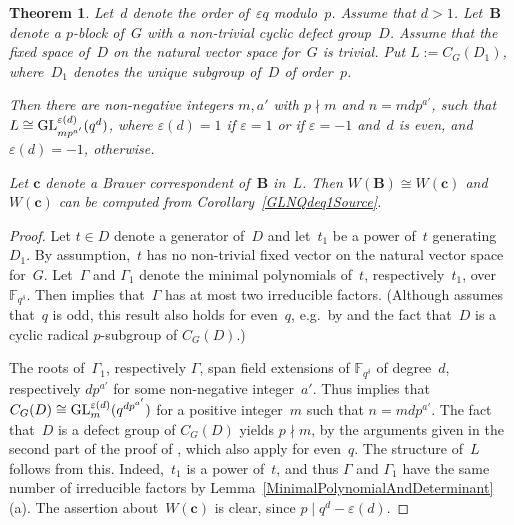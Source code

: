 \documentclass[12pt]{amsart}
\newcommand{\bB}{{\mathbf{B}}}
\newcommand{\bc}{{\mathbf{c}}}
\def\GL{ \text{\rm GL} }
\newtheorem{thm}{Theorem}[subsection]
\theoremstyle{theorem}
\theoremstyle{definition}
\theoremstyle{remark}
\begin{document}
\begin{thm}
\label{GLNQdneq1}
Let~$d$ denote the order of~$\varepsilon q$ modulo~$p$. Assume that $d > 1$.
Let~${\bB}$ denote a $p$-block of~${G}$ with a non-trivial cyclic 
defect group~${D}$. Assume that the fixed space of~${D}$ on the 
natural vector space for~${G}$ is trivial.
Put ${L} := C_{{G}}( {D}_1 )$, where~${D}_1$ denotes the 
unique subgroup of~${D}$ of order~$p$.

Then there are non-negative integers $m, a'$ with $p \nmid m$ and 
$n = mdp^{a'}$, such that 
${L} \cong \GL_{mp^{a'}}^{\varepsilon(d)}( q^{d} )$, where
$\varepsilon(d) = 1$ if $\varepsilon = 1$ or if $\varepsilon = -1$ and~$d$ is 
even, and $\varepsilon(d) = -1$, otherwise.

Let ${\bc}$ denote a Brauer correspondent of~${\bB}$ in~${L}$.  
Then $W( {\bB} ) \cong W( {\bc} )$ and $W( {\bc} )$ can be
computed from 
{\rm Corollary~\ref{GLNQdeq1Source}}.
\end{thm}
\begin{proof}
Let $t \in {D}$ denote a generator of~${D}$ and let~$t_1$ be a power of~$t$ 
generating~${D}_1$. By assumption,~$t$ has no non-trivial fixed vector on the 
natural vector space for~${G}$. Let~$\Gamma$ and $\Gamma_1$ denote the minimal
polynomials of~$t$, respectively~$t_1$, over $\mathbb{F}_{q^{\delta}}$. Then 
\cite[Theorem (3C)]{fs2} implies that~$\Gamma$ has at most two irreducible 
factors. (Although \cite{fs2} assumes that~$q$ is odd, this result also holds 
for even~$q$, e.g.\ by \cite[Theorem~$6.1.2$]{FLO} and the fact that~$D$ is a 
cyclic radical $p$-subgroup of $C_G(D)$.)

The roots of~$\Gamma_1$, respectively $\Gamma$, span field extensions of 
$\mathbb{F}_{q^{\delta}}$ of degree~$d$, respectively $dp^{a'}$ for some 
non-negative integer~$a'$. Thus \cite[Theorem~$6.1.2$]{FLO} implies that
$C_{{G}}( {D} ) \cong \GL_m^{\varepsilon(d)}( q^{dp^{a'}} )$ for a positive
integer~$m$ such that $n = mdp^{a'}$. The fact that~$D$ is a defect group of
$C_G( D )$ yields $p \nmid m$, by the arguments given in the second part
of the proof of \cite[Proposition (4B)]{fs2}, which also apply for even~$q$. The 
structure of~${L}$ follows from this. Indeed,~$t_1$ is a power of~$t$, and thus
$\Gamma$ and $\Gamma_1$ have the same number of irreducible factors by 
Lemma~\ref{MinimalPolynomialAndDeterminant}(a). The assertion 
about~$W( {\bc} )$ is clear, since $p \mid q^d - \varepsilon(d)$.
\end{proof}
\end{document}
